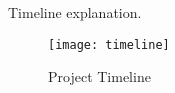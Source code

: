 \TODO Timeline explanation.

\begin{figure}
    \centering
    \texttt{[image: timeline]}
    \caption{Project Timeline}
    \label{fig:project_timeline}
\end{figure}

